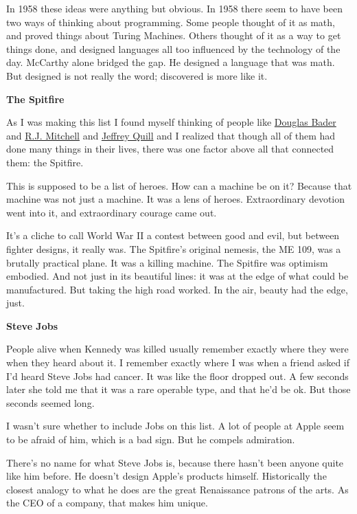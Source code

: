 In 1958 these ideas were anything but obvious. In 1958 there seem to
have been two ways of thinking about programming. Some people thought of
it as math, and proved things about Turing Machines. Others thought of
it as a way to get things done, and designed languages all too
influenced by the technology of the day. McCarthy alone bridged the gap.
He designed a language that was math. But designed is not really the
word; discovered is more like it.

\textbf{The Spitfire}

As I was making this list I found myself thinking of people like
\href{http://en.wikipedia.org/wiki/Douglas_Bader}{Douglas Bader} and
\href{http://en.wikipedia.org/wiki/R._J._Mitchell}{R.J. Mitchell} and
\href{http://www.amazon.com/Spitfire-Pilots-Story-Crecy-Cover/dp/0947554726}{Jeffrey
Quill} and I realized that though all of them had done many things in
their lives, there was one factor above all that connected them: the
Spitfire.

This is supposed to be a list of heroes. How can a machine be on it?
Because that machine was not just a machine. It was a lens of heroes.
Extraordinary devotion went into it, and extraordinary courage came out.

It's a cliche to call World War II a contest between good and evil, but
between fighter designs, it really was. The Spitfire's original nemesis,
the ME 109, was a brutally practical plane. It was a killing machine.
The Spitfire was optimism embodied. And not just in its beautiful lines:
it was at the edge of what could be manufactured. But taking the high
road worked. In the air, beauty had the edge, just.

\textbf{Steve Jobs}

People alive when Kennedy was killed usually remember exactly where they
were when they heard about it. I remember exactly where I was when a
friend asked if I'd heard Steve Jobs had cancer. It was like the floor
dropped out. A few seconds later she told me that it was a rare operable
type, and that he'd be ok. But those seconds seemed long.

I wasn't sure whether to include Jobs on this list. A lot of people at
Apple seem to be afraid of him, which is a bad sign. But he compels
admiration.

There's no name for what Steve Jobs is, because there hasn't been anyone
quite like him before. He doesn't design Apple's products himself.
Historically the closest analogy to what he does are the great
Renaissance patrons of the arts. As the CEO of a company, that makes him
unique.

